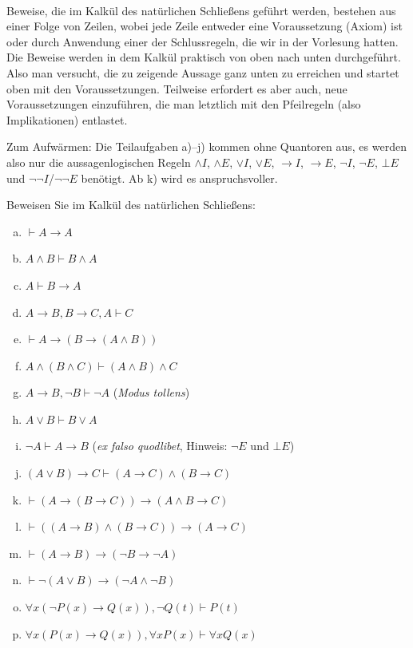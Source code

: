 \\
Beweise, die im Kalkül des natürlichen Schließens geführt werden, bestehen aus einer Folge von Zeilen, wobei jede Zeile entweder eine Voraussetzung (Axiom) ist oder durch Anwendung einer der Schlussregeln, die wir in der Vorlesung hatten.
Die Beweise werden in dem Kalkül praktisch von oben nach unten durchgeführt. Also man versucht, die zu zeigende Aussage ganz unten zu erreichen und startet oben mit den Voraussetzungen. Teilweise erfordert es aber auch, neue Voraussetzungen einzuführen, die man letztlich mit den Pfeilregeln (also Implikationen) entlastet.

Zum Aufwärmen: Die Teilaufgaben a)--j) kommen ohne Quantoren aus, es werden also nur die aussagenlogischen Regeln $\wedge I$, $\wedge E$, $\vee I$, $\vee E$, $\to I$, $\to E$, $\neg I$, $\neg E$, $\bot E$ und $\neg\neg I$/$\neg\neg E$ benötigt. Ab k) wird es anspruchsvoller.

Beweisen Sie im Kalkül des natürlichen Schließens:
\begin{enumerate}[a)]
  \item $\vdash A\to A$
  \item $A\wedge B\vdash B\wedge A$
  \item $A\vdash B\to A$
  \item $A\to B, B\to C, A\vdash C$
  \item $\vdash A\to(B\to(A\wedge B))$
  \item $A\wedge(B\wedge C)\vdash(A\wedge B)\wedge C$
  \item $A\to B,\neg B\vdash\neg A$ \quad (\textit{Modus tollens})
  \item $A\vee B\vdash B\vee A$
  \item $\neg A\vdash A\to B$ \quad (\textit{ex falso quodlibet}, Hinweis: $\neg E$ und $\bot E$)
  \item $(A\vee B)\to C\vdash(A\to C)\wedge(B\to C)$
  \item $\vdash (A\to(B\to C))\to(A\wedge B\to C)$
  \item $\vdash ((A\to B)\wedge (B\to C))\to(A\to C)$
  \item $\vdash (A\to B)\to(\neg B\to \neg A)$
  \item $\vdash\neg(A\vee B)\to(\neg A\wedge \neg B)$
  \item $\forall x(\neg P(x)\to Q(x)),\neg Q(t)\vdash P(t)$
  \item $\forall x(P(x)\to Q(x)), \forall x P(x)\vdash \forall x Q(x)$
\end{enumerate}

